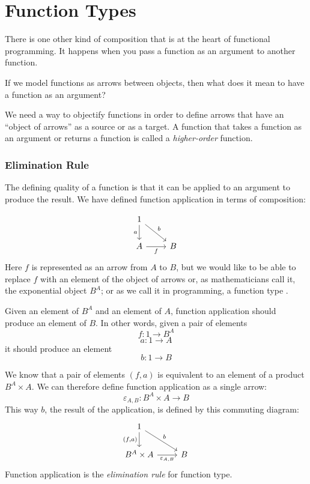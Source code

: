 \documentclass[DaoFP]{subfiles}
\begin{document}
\setcounter{chapter}{5}

\chapter{Function Types}

There is one other kind of composition that is at the heart of functional programming. It happens when you pass a function as an argument to another function. 

If we model functions as arrows between objects, then what does it mean to have a function as an argument? 

We need a way to objectify functions in order to define arrows that have an ``object of arrows'' as a source or as a target. A function that takes a function as an argument or returns a function is called a \emph{higher-order} function.

\subsection{Elimination Rule}

The defining quality of a function is that it can be applied to an argument to produce the result. We have defined function application in terms of composition:

\[
 \begin{tikzcd}
 1
 \arrow[d, "a"']
 \arrow[rd, "b"]
 \\
 A
 \arrow[r, "f"']
& B
 \end{tikzcd}
\]
Here $f$ is represented as an arrow from $A$ to $B$, but we would like to be able to replace $f$ with an element of the object of arrows or, as mathematicians call it, the exponential object $B^A$; or as we call it in programming, a function type . 

Given an element of $B^A$ and an element of $A$, function application should produce an element of $B$. In other words, given a pair of elements
\[f \colon 1 \to B^A\]
\[a \colon 1 \to A\]
it should produce an element
\[b \colon 1 \to B \]


We know that a pair of elements $(f, a)$ is equivalent to an element of a product $B^A \times A$. We can therefore define function application as a single arrow:
\[\varepsilon_{A, B} \colon B^A \times A \to B\]
This way $b$, the result of the application, is defined by this commuting diagram:
\[
 \begin{tikzcd}
 1
 \arrow[d, "{(f, a)}"']
 \arrow[rd, "b"]
 \\
 B^A \times A
 \arrow[r, "\varepsilon_{A, B}"']
& B
 \end{tikzcd}
\]
Function application is the \emph{elimination rule} for function type. 
\end{document}
